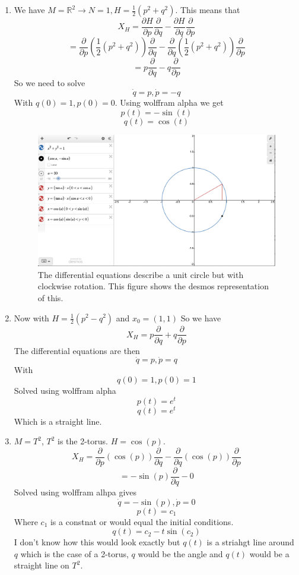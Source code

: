 \documentclass[12pt]{article}
\begin{document}
\begin{enumerate}
\begin{enumerate}
        \item We have $M = \mathbb{R}^2 \rightarrow N=1, H= \frac{1}{2} ( p^2 + q^2) $. This means that 
        $$ X_H = \frac{\partial H}{\partial p} \frac{\partial}{\partial q} - \frac{\partial H}{\partial q} \frac{\partial}{\partial p} $$
        $$ = \frac{\partial}{\partial p} ( \frac{1}{2} ( p^2 + q^2)) \frac{\partial}{\partial q} - \frac{\partial}{\partial q} (\frac{1}{2} (p^2 + q^2 )) \frac{\partial}{\partial p} $$
        $$ = p \frac{\partial}{\partial q} - q \frac{\partial}{\partial p} $$
        So we need to solve 
        $$ \dot{q} = p, \dot{p} = - q $$
        With $q(0) =1, p(0) =0$. Using wolffram alpha we get 
        $$ p(t) = - \sin (t) $$
        $$ q (t) = \cos (t) $$
        \begin{figure}[h]
            
            \includegraphics[width=15cm]{desmos1.png}
            \centering
            \caption{The differential equations describe a unit circle but with clockwise rotation. This figure shows the desmos representation of this. }
        \end{figure}

        \item Now with $H = \frac{1}{2} (p^2 - q^2)$ and $x_0 = (1,1)$ So we have 
        $$ X_H = p \frac{\partial}{\partial q} + q \frac{\partial}{\partial p} $$
        The differential equations are then 
        $$ \dot{q} = p, \dot{p} = q $$
        With 
        $$ q(0) =1, p(0) =1 $$
        Solved using wolffram alpha
        $$ p(t) = e^t $$
        $$ q(t) = e^t $$ 
        Which is a straight line. 

        \item $M = T^2$, $T^2$ is the 2-torus. $H = \cos (p)$. 
        $$ X_H = \frac{\partial}{\partial p} ( \cos (p) ) \frac{\partial}{\partial q} - \frac{\partial}{\partial q} ( \cos (p)) \frac{\partial}{\partial p} $$
        $$ = - \sin (p) \frac{\partial}{\partial q} - 0 $$
        Solved using wolffram alhpa gives 
        $$ \dot{q} = - \sin (p), \dot{p} = 0 $$
        $$ p(t) = c_1 $$
        Where $c_1$ is a constnat or would equal the initial conditions. 
        $$ q(t) = c_2 - t \sin (c_2) $$
        I don't know how this would look exactly but $q(t)$ is a striahgt line around $q$ which is the case of a 2-torus, $q$ would be the angle and $q(t)$ would be a straight line on $T^2$. 



\end{enumerate}
\end{enumerate}
\end{document}
